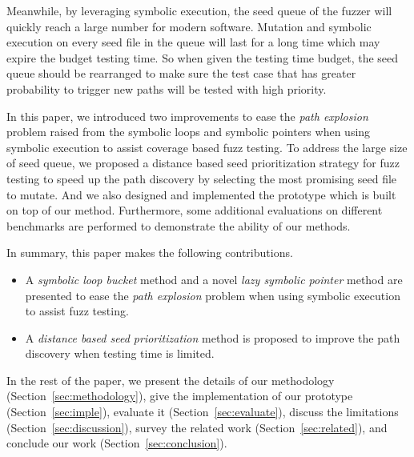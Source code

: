 Meanwhile, by leveraging symbolic execution, the seed queue of the fuzzer will quickly reach a large number for modern software. Mutation and symbolic execution on every seed file in the queue will last for a long time which may expire the budget testing time. So when given the testing time budget, the seed queue should be rearranged to make sure the test case that has greater probability to trigger new paths will be tested with high priority. 

In this paper, we introduced two improvements to ease the \textit{path explosion} problem raised from the symbolic loops and symbolic pointers when using symbolic execution to assist coverage based fuzz testing. To address the large size of seed queue, we proposed a distance based seed prioritization strategy for fuzz testing to speed up the path discovery by selecting the most promising seed file to mutate. 
And we also designed and implemented the prototype which is built on top of our method. Furthermore, some additional evaluations on different benchmarks are performed to demonstrate the ability of our methods.

In summary, this paper makes the following contributions.
\begin{itemize}
\item A \emph{symbolic loop bucket} method and a novel \emph{lazy symbolic pointer} method are presented to ease the \emph{path explosion} problem when using symbolic execution to assist fuzz testing.

\item A \emph{distance based seed prioritization} method is proposed to improve the path discovery when testing time is limited.
\end{itemize}

In the rest of the paper, we present the details of our methodology (Section~\ref{sec:methodology}), give the implementation of our prototype (Section~\ref{sec:imple}), evaluate it (Section~\ref{sec:evaluate}), discuss the limitations (Section~\ref{sec:discussion}), survey the related work (Section~\ref{sec:related}), and conclude our work (Section~\ref{sec:conclusion}).
